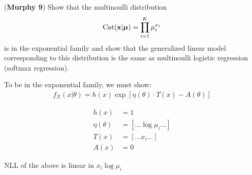 \documentclass[12pt,letterpaper,fleqn]{hmcpset}
\begin{document}
\begin{problem}[2]
(\textbf{Murphy 9}) Show that the multinoulli distribution
\[
    \text{Cat}({\bf x}|\hbox{\boldmath$\mu$}) = \prod_{i=1}^K \mu_i^{x_i}
\]
is in the exponential family and show that the generalized linear model
corresponding to this distribution is the same as multinoulli logistic
regression (softmax regression).
\end{problem}
\begin{solution}

To be in the exponential family, we must show:
\begin{equation}\begin{aligned}
f_X(x|\theta) = h(x) \exp[ \eta(\theta) \cdot T(x) - A(\theta) ]
\end{aligned}\end{equation}

\begin{equation}\begin{aligned}
    h(x) & = 1 \\
    \eta(\theta) & = [ ... \log \mu_i ... ] \\
    T(x) & = [ ... x_i ... ] \\
    A(x) & = 0
\end{aligned}\end{equation}



NLL of the above is linear in $x_i \log \mu_i$ 

\vfill
\end{solution}
\newpage
\end{document}
